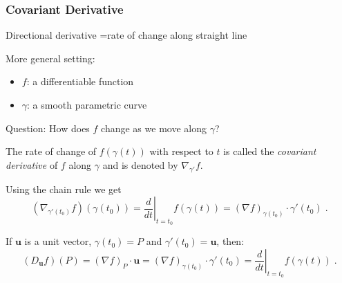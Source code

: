 \begin{frame}
  \frametitle{Covariant Derivative}

  Directional derivative =rate of change along straight line

\pause
  More general setting:
  \begin{itemize}
    \item $f$: a differentiable function
    \item $\gamma$: a smooth parametric curve
  \end{itemize}

\pause
Question: How does $f$ change as we move along $\gamma$?

\begin{definition}
  The rate of change of $f(\gamma(t))$ with respect to $t$ is called the \emph{covariant derivative} of $f$ along $\gamma$ and is denoted by $\nabla_{\gamma'} f$.
\end{definition}

\pause
Using the chain rule we get
%
$$(\nabla_{\gamma'(t_0)} f) (\gamma(t_0)) = \left. \frac{d}{dt}\right|_{t=t_0} f(\gamma(t)) = (\nabla f)_{\gamma(t_0)} \cdot \gamma'(t_0) \; .$$
%

\pause
If $\textbf{u}$ is a unit vector,  $\gamma(t_0) = P$ and $\gamma'(t_0) = \textbf{u}$, then:
%
$$(D_{\textbf{u}} f)(P) = (\nabla f)_P \cdot \textbf{u} =
(\nabla f)_{\gamma(t_0)} \cdot \gamma'(t_0) = \left. \frac{d}{dt}\right|_{t=t_0} f(\gamma(t))\; .$$
%
\end{frame}